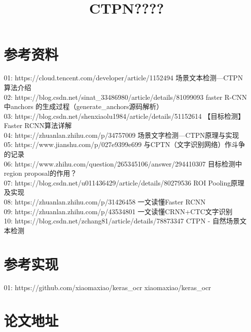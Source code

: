 \documentclass[11pt]{article}
\title{CTPN????}
\begin{document}
    
    
    \maketitle
    
    

    
    \hypertarget{ux53c2ux8003ux8d44ux6599}{%
\section{参考资料}\label{ux53c2ux8003ux8d44ux6599}}

    01: https://cloud.tencent.com/developer/article/1152494
场景文本检测---CTPN算法介绍\\
02: https://blog.csdn.net/sinat\_33486980/article/details/81099093
faster R-CNN中anchors 的生成过程（generate\_anchors源码解析）\\
03: https://blog.csdn.net/shenxiaolu1984/article/details/51152614
【目标检测】Faster RCNN算法详解\\
04: https://zhuanlan.zhihu.com/p/34757009
场景文字检测---CTPN原理与实现\\
05: https://www.jianshu.com/p/027e9399e699
与CPTN（文字识别网络）作斗争的记录\\
06: https://www.zhihu.com/question/265345106/answer/294410307
目标检测中region proposal的作用？\\
07: https://blog.csdn.net/u011436429/article/details/80279536 ROI
Pooling原理及实现\\
08: https://zhuanlan.zhihu.com/p/31426458 一文读懂Faster RCNN\\
09: https://zhuanlan.zhihu.com/p/43534801 一文读懂CRNN+CTC文字识别\\
10: https://blog.csdn.net/zchang81/article/details/78873347 CTPN -
自然场景文本检测

    \hypertarget{ux53c2ux8003ux5b9eux73b0}{%
\section{参考实现}\label{ux53c2ux8003ux5b9eux73b0}}

    01: https://github.com/xiaomaxiao/keras\_ocr xiaomaxiao/keras\_ocr

    \hypertarget{ux8bbaux6587ux5730ux5740}{%
\section{论文地址}\label{ux8bbaux6587ux5730ux5740}}
\end{document}
